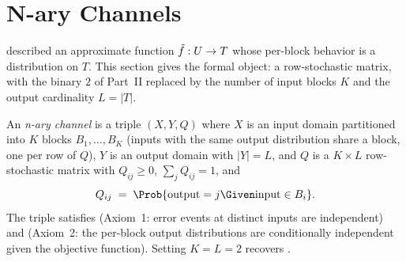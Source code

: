 %

\section{N-ary Channels}
\label{sec:n-ary-channels}

 described an approximate function $\tilde{f} :
U \to T$ whose per-block behavior is a distribution on $T$. This
section gives the formal object: a row-stochastic matrix, with the binary $2$
of Part~II replaced by the number of input blocks $K$ and the output
cardinality $L = |T|$.

\begin{definition}
\label{def:n-ary-channel}
An \emph{n-ary channel} is a triple $(X, Y, Q)$ where $X$ is an input domain
partitioned into $K$ blocks $B_1, \ldots, B_K$ (inputs with the same output
distribution share a block, one per row of $Q$), $Y$ is an output domain with
$|Y| = L$, and $Q$ is a $K \times L$ row-stochastic matrix with $Q_{ij} \ge 0$,
$\sum_j Q_{ij} = 1$, and
\[
  Q_{ij} \;=\; \Prob{\text{output} = j \Given \text{input} \in B_i}.
\]
The triple satisfies  (Axiom~1: error events at distinct
inputs are independent) and  (Axiom~2: the per-block
output distributions are conditionally independent given the objective
function). Setting $K = L = 2$ recovers .
\end{definition}

